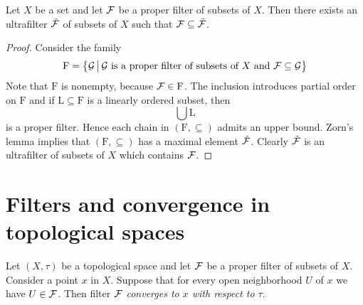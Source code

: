 \begin{proposition}\label{proposition:existence_of_ultrafilters}
Let $X$ be a set and let ${\mathcal F}$ be a proper filter of subsets of $X$. Then there exists an ultrafilter $\tilde{{\mathcal F}}$ of subsets of $X$ such that ${\mathcal F} \subseteq \tilde{{\mathcal F}}$.
\end{proposition}
\begin{proof}
Consider the family
$$\mathrm{F} = \big\{{\mathcal G}\,\big|\,{\mathcal G}\mbox{ is a proper filter of subsets of }X\mbox{ and }{\mathcal F} \subseteq {\mathcal G}\big\}$$
Note that $\mathrm{F}$ is nonempty, because ${\mathcal F} \in \mathrm{F}$. The inclusion introduces partial order on $\mathrm{F}$ and if $\mathrm{L}\subseteq \mathrm{F}$ is a linearly ordered subset, then
$$\bigcup \mathrm{L}$$
is a proper filter. Hence each chain in $\left(\mathrm{F},\subseteq\right)$ admits an upper bound. Zorn's lemma implies that $\left(\mathrm{F},\subseteq\right)$ has a maximal element $\tilde{{\mathcal F}}$. Clearly $\tilde{{\mathcal F}}$ is an ultrafilter of subsets of $X$ which contains ${\mathcal F}$.
\end{proof}

\section{Filters and convergence in topological spaces}

\begin{definition}
Let $(X,\tau)$ be a topological space and let ${\mathcal F}$ be a proper filter of subsets of $X$. Consider a point $x$ in $X$. Suppose that for every open neighborhood $U$ of $x$ we have $U \in {\mathcal F}$. Then filter ${\mathcal F}$ \textit{converges to $x$ with respect to $\tau$}.
\end{definition}

